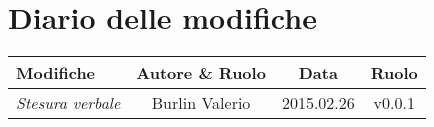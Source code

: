 \newpage
\section*{Diario delle modifiche}

\begin{table}[h]
\centering
\begin{tabular}{|l|c|c|c|}
	\toprule
		\textbf{Modifiche} & \textbf{Autore \& Ruolo} & \textbf{Data} & \textbf{Ruolo} \\
	\midrule
	\midrule
		\textit{Stesura verbale} & Burlin Valerio & 2015.02.26 & v0.0.1 \\
	\bottomrule
\end{tabular}	
\end{table}

\newpage